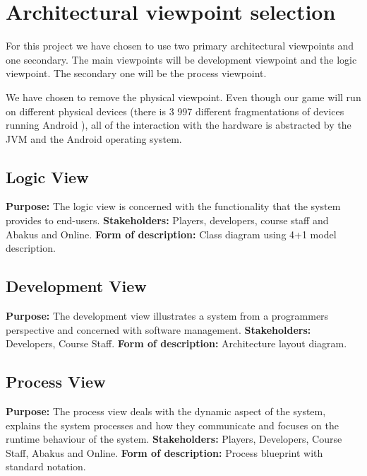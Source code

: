 \section{Architectural viewpoint selection} 
\label{architecturalviewpointselection}

For this project we have chosen to use two primary architectural viewpoints and one secondary. 
The main viewpoints will be development viewpoint and the logic viewpoint. The secondary one will be the process viewpoint.

We have chosen to remove the physical viewpoint. Even though our game will run on different physical devices (there is 3 997 different fragmentations of devices running Android \cite{website:androidfragmentations}), all of the interaction with the hardware is abstracted by the JVM and the Android operating system.

\subsection{Logic View}
{\bf Purpose: } The logic view is concerned with the functionality that the system provides to end-users.
{\bf Stakeholders: } Players, developers, course staff and Abakus and Online.
{\bf Form of description: } Class diagram using 4+1 model description.

\subsection{Development View}
{\bf Purpose: } The development view illustrates a system from a programmers perspective and concerned with software management.
{\bf Stakeholders: } Developers, Course Staff.
{\bf Form of description: } Architecture layout diagram.

\subsection{Process View}
{\bf Purpose: } The process view deals with the dynamic aspect of the system, explains the system processes and how they communicate and focuses on the runtime behaviour of the system.
{\bf Stakeholders: } Players, Developers, Course Staff, Abakus and Online.
{\bf Form of description: } Process blueprint with standard notation.